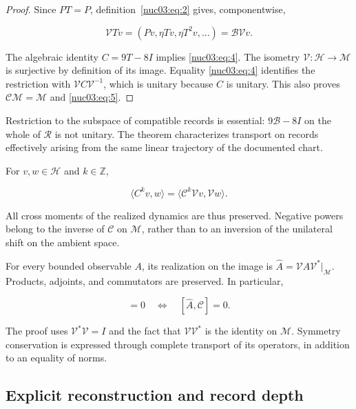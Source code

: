 \begin{proof}
Since \(PT=P\), definition~\eqref{nuc03:eq:2} gives, componentwise,

\[
\mathcal VT v=(Pv,\eta Tv,\eta T^2v,\ldots)=\mathcal B\mathcal Vv.
\]

The algebraic identity \(C=9T-8I\) implies \eqref{nuc03:eq:4}. The isometry \(\mathcal V:\mathcal H\to\mathcal M\) is surjective by definition of its image. Equality \eqref{nuc03:eq:4} identifies the restriction with \(\mathcal V C\mathcal V^{-1}\), which is unitary because \(C\) is unitary. This also proves \(\mathcal C\mathcal M=\mathcal M\) and \eqref{nuc03:eq:5}.
\end{proof}

Restriction to the subspace of compatible records is essential: \(9\mathcal B-8I\) on the whole of \(\mathcal R\) is not unitary. The theorem characterizes transport on records effectively arising from the same linear trajectory of the documented chart.

\begin{corollary}
For \(v,w\in\mathcal H\) and \(k\in\mathbb Z\),

\begin{equation}
\langle C^kv,w\rangle
=\langle\mathcal C^k\mathcal Vv,\mathcal Vw\rangle.
\label{nuc03:eq:6}
\end{equation}

All cross moments of the realized dynamics are thus preserved. Negative powers belong to the inverse of \(\mathcal C\) on \(\mathcal M\), rather than to an inversion of the unilateral shift on the ambient space.
\end{corollary}

\begin{corollary}
For every bounded observable \(A\), its realization on the image is \(\widehat A=\mathcal V A\mathcal V^*|_{\mathcal M}\). Products, adjoints, and commutators are preserved. In particular,

\begin{equation}
[A,C]=0\quad\Longleftrightarrow\quad[\widehat A,\mathcal C]=0.
\label{nuc03:eq:7}
\end{equation}
\end{corollary}

The proof uses \(\mathcal V^*\mathcal V=I\) and the fact that \(\mathcal V\mathcal V^*\) is the identity on \(\mathcal M\). Symmetry conservation is expressed through complete transport of its operators, in addition to an equality of norms.

\subsection{Explicit reconstruction and record depth}

